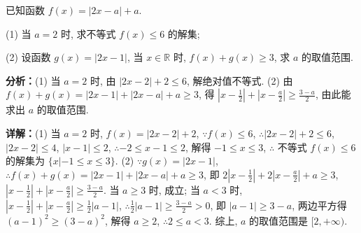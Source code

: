 \begin{question}[points=10]
[选修4-5：不等式选讲]

已知函数 $f(x)=|2x-a|+a$.

(1) 当 $a=2$ 时, 求不等式 $f(x)\le6$ 的解集;

(2) 设函数 $g(x)=|2x-1|$, 当 $x\in\mathbb{R}$ 时, $f(x)+g(x)\ge3$, 求 $a$ 的取值范围.
\begin{solution}

\textbf{分析：}(1) 当 $a=2$ 时, 由 $|2x-2|+2\le6$, 解绝对值不等式. (2) 由 $f(x)+g(x)=|2x-1|+|2x-a|+a\ge3$, 得 $|x-\frac{1}{2}|+|x-\frac{a}{2}|\ge\frac{3-a}{2}$, 由此能求出 $a$ 的取值范围.

\textbf{详解：}(1) 当 $a=2$ 时, $f(x)=|2x-2|+2$, $\because f(x)\le6$, $\therefore|2x-2|+2\le6$, $|2x-2|\le4$, $|x-1|\le2$, $\therefore-2\le x-1\le2$, 解得 $-1\le x\le3$, $\therefore$ 不等式 $f(x)\le6$ 的解集为 $\{x|-1\le x\le3\}$.
(2) $\because g(x)=|2x-1|$, $\therefore f(x)+g(x)=|2x-1|+|2x-a|+a\ge3$, 即 $2|x-\frac{1}{2}|+2|x-\frac{a}{2}|+a\ge3$, $|x-\frac{1}{2}|+|x-\frac{a}{2}|\ge\frac{3-a}{2}$. 当 $a\ge3$ 时, 成立; 当 $a<3$ 时, $|x-\frac{1}{2}|+|x-\frac{a}{2}|\ge\frac{1}{2}|a-1|$, $\therefore\frac{1}{2}|a-1|\ge\frac{3-a}{2}>0$, 即 $|a-1|\ge3-a$, 两边平方得 $(a-1)^2\ge(3-a)^2$, 解得 $a\ge2$, $\therefore2\le a<3$. 综上, $a$ 的取值范围是 $[2,+\infty)$.
\end{solution}
\end{question}

